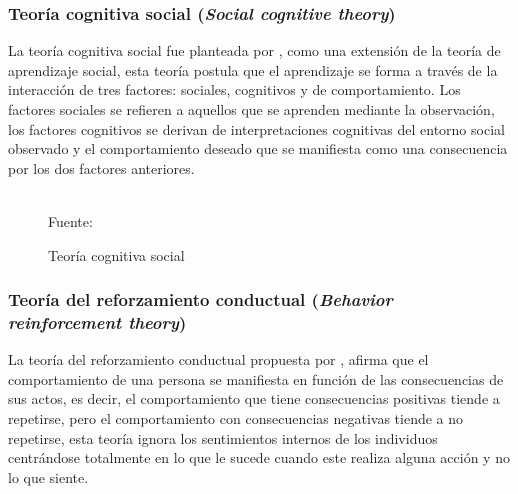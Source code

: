 \subsubsection{Teoría cognitiva social (\textit{Social cognitive theory})}

La teoría cognitiva social fue planteada por , como una extensión de la teoría de 
aprendizaje social, esta teoría postula que el aprendizaje se forma a través de la interacción de tres
factores: sociales, cognitivos y de comportamiento. Los factores sociales se refieren a aquellos que se 
aprenden mediante la observación, los factores cognitivos se derivan de interpretaciones cognitivas del 
entorno social observado y el comportamiento deseado que se manifiesta como una consecuencia por los dos 
factores anteriores.

\begin{figure}[ht]
\caption{Teoría cognitiva social}
\label{img:TCS}
\centering
{}
\\
{\footnotesize Fuente: \citeA<basada en>{bandura1986social}}
\end{figure}

\subsubsection{Teoría del reforzamiento conductual (\textit{Behavior reinforcement theory})}

La teoría del reforzamiento conductual propuesta por , afirma que el 
comportamiento de una persona se manifiesta en función de las consecuencias de sus actos, es decir, el 
comportamiento que tiene consecuencias positivas tiende a repetirse, pero el comportamiento con consecuencias
negativas tiende a no repetirse, esta teoría ignora los sentimientos internos de los individuos centrándose 
totalmente en lo que le sucede cuando este realiza alguna acción y no lo que siente.

